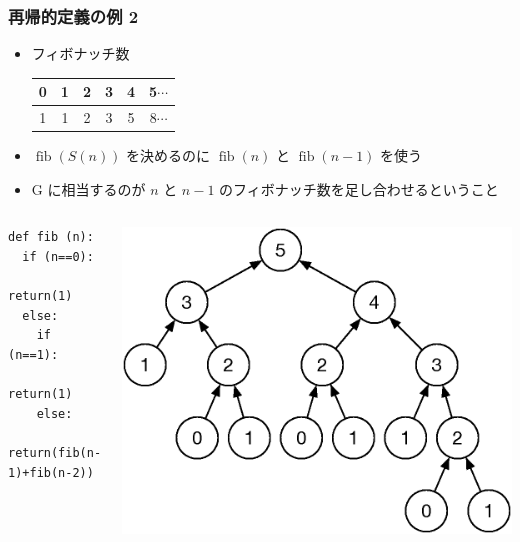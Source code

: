 \begin{frame}[fragile]
\frametitle{再帰的定義の例 2}
  \begin{itemize}
\item フィボナッチ数\\
    \begin{tabular}{c|c|c|c|c|c}
0&1&2&3&4&5$\cdots$\\
\hline
1&1&2&3&5&8$\cdots$
    \end{tabular}
\item \({\mathop{\mathrm{fib}}}(S(n))\) を決めるのに \({\mathop{\mathrm{fib}}}(n)\) と \({\mathop{\mathrm{fib}}}(n-1)\) を使う
\item G に相当するのが \(n\) と \(n-1\) のフィボナッチ数を足し合わせるということ
  \end{itemize}
  \begin{columns}[c]
    \begin{column}{0.5\textwidth}
      \begin{lstlisting}[caption={フィボナッチ数},label=fib-rec]
def fib (n):
  if (n==0):
    return(1)
  else:
    if (n==1):
      return(1)
    else:
      return(fib(n-1)+fib(n-2))
      \end{lstlisting}
    \end{column}
    \begin{column}{0.45\textwidth}
      \begin{example}[fib\((5)\)]
        \begin{center}
\includegraphics[scale=0.3]{./Figure/elementaryCS-2nd-figFib.eps}
        \end{center}
      \end{example}
    \end{column}
  \end{columns}
\end{frame}
